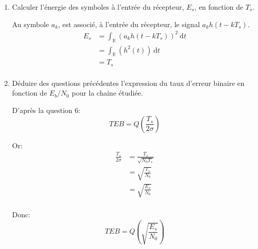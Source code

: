 \documentclass[frenchb]{article}
\begin{document}
\begin{enumerate}
        \item Calculer l'énergie des symboles à l'entrée du récepteur, $E_s$, en fonction de $T_s$.
        \par\leavevmode\par
        Au symbole $a_k$, est associé, à l'entrée du récepteur, le signal $a_k h(t-kT_s)$.
        \begin{equation*}
        \begin{split}
        E_s &= \int_{\mathbb{R}} \left(a_k h(t-kT_s)\right)^2 \ \mathrm{d}t \\
        & = \int_{\mathbb{R}} \left(h^2(t)\right) \ \mathrm{d}t \\
        & = T_s \\        
        \end{split}
        \end{equation*}
        \par\leavevmode\par
        \item Déduire des questions précédentes l'expression du taux d'erreur binaire en fonction de $E_b/N_0$ pour la chaine étudiée.
        \par\leavevmode\par
        D'après la question $6$:
        $$ TEB = Q\left(\frac{T_s}{2 \sigma}\right) $$
        
        Or:
        \begin{equation*}
        \begin{split}
        \frac{T_s}{2 \sigma} &= \frac{T_s}{\sqrt{N_0 T_s}} \\
        & = \sqrt{\frac{T_s}{N_0}} \\
        & = \sqrt{\frac{E_s}{N_0}} \\
        \end{split}
        \end{equation*}
        
        Donc:
        $$\boxed{TEB = Q\left(\sqrt{\frac{E_s}{N_0}}\right)} $$
    \end{enumerate}
\end{document}
